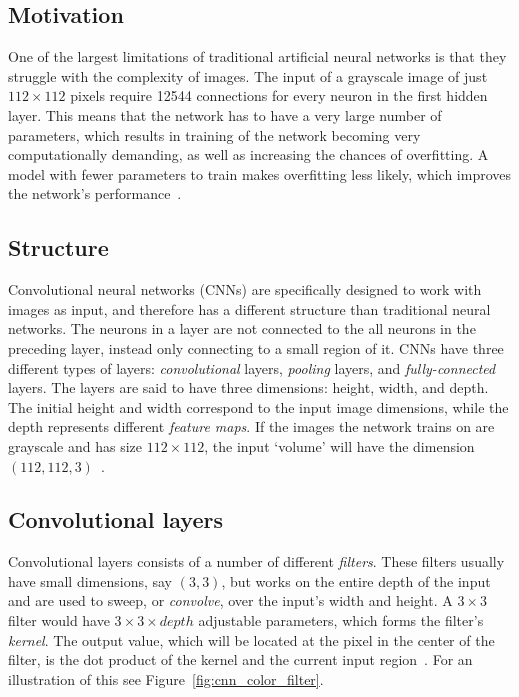 \documentclass{kththesis}
\newcommand{\num}[1]{{#1}}
\begin{document}
\subsection{Motivation}
One of the largest limitations of traditional artificial neural networks is that they struggle with the complexity of images. The input of a grayscale image of just $112 \times 112$ pixels require \num{12544} connections for every neuron in the first hidden layer. This means that the network has to have a very large number of parameters, which results in training of the network becoming very computationally demanding, as well as increasing the chances of overfitting. A model with fewer parameters to train makes overfitting less likely, which improves the network's performance~\cite{cnnIntro}.

\subsection{Structure}
Convolutional neural networks (CNNs) are specifically designed to work with images as input, and therefore has a different structure than traditional neural networks.
The neurons in a layer are not connected to the all neurons in the preceding layer, instead only connecting to a small region of it.
CNNs have three different types of layers: \textit{convolutional} layers, \textit{pooling} layers, and \textit{fully-connected} layers.
The layers are said to have three dimensions: height, width, and depth. The initial height and width correspond to the input image dimensions, while the depth represents different \textit{feature maps}.
If the images the network trains on are grayscale and has size $112 \times 112$, the input `volume' will have the dimension $(112, 112, 3)$~\cite{cnnIntro}.

\subsection{Convolutional layers}
Convolutional layers consists of a number of different \textit{filters}. These filters usually have small dimensions, say $(3, 3)$, but works on the entire depth of the input and are used to sweep, or \textit{convolve}, over the input's width and height. A $3 \times 3$ filter would have $3 \times 3 \times depth$ adjustable parameters, which forms the filter's \textit{kernel}. The output value, which will be located at the pixel in the center of the filter, is the dot product of the kernel and the current input region~\cite{cnnIntro}. For an illustration of this see Figure~\ref{fig:cnn_color_filter}.
\end{document}
